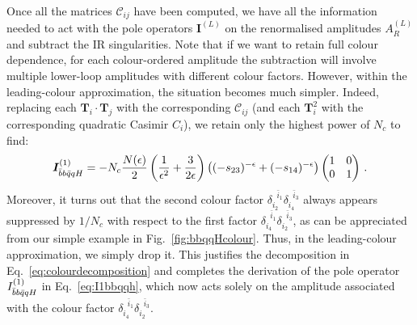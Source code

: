 \documentclass[main.tex]{subfiles}
\begin{document}
Once all the matrices $\mathcal{C}_{ij}$ have been computed, we have all the information needed to act with the pole operators $\bm{I}^{(L)}$ on the renormalised amplitudes $A_R^{(L)}$ and subtract the IR singularities. Note that if we want to retain full colour dependence, for each colour-ordered amplitude the subtraction will involve multiple lower-loop amplitudes with different colour factors. However, within the leading-colour approximation, the situation becomes much simpler. Indeed, replacing each $\bm{T}_i \cdot \bm{T}_j$ with the corresponding $\mathcal{C}_{ij}$ (and each $\bm{T}_i^2$ with the corresponding quadratic Casimir $C_i$), we retain only the highest power of $N_c$ to find:
\begin{equation}
    \bm{I}_{\bar{b}b\bar{q}qH}^{(1)} = -N_c \frac{N(\epsilon)}{2}\left(\frac{1}{\epsilon^2} + \frac{3}{2\epsilon} \right) \left((-s_{23})^{-\epsilon} + (-s_{14})^{-\epsilon}\right)
    \begin{pmatrix}
        1 & 0 \\
        0 & 1
    \end{pmatrix}\,.
\end{equation}
Moreover, it turns out that the second colour factor $\delta_{i_2}^{\;\;\bar{i}_1} \delta_{i_4}^{\;\;\bar{i}_3}$ always appears suppressed by $1/N_c$ with respect to the first factor $\delta_{i_4}^{\;\;\bar{i}_1} \delta_{i_2}^{\;\;\bar{i}_3}$, as can be appreciated from our simple example in Fig.~\ref{fig:bbqqHcolour}. Thus, in the leading-colour approximation, we simply drop it. This justifies the decomposition in Eq.~\ref{eq:colourdecomposition} and completes the derivation of the pole operator $I_{\bar{b}b\bar{q}qH}^{(1)}$ in Eq.~\ref{eq:I1bbqqh}, which now acts solely on the amplitude associated with the colour factor $\delta_{i_4}^{\;\;\bar{i}_1} \delta_{i_2}^{\;\;\bar{i}_3}$.
\end{document}
